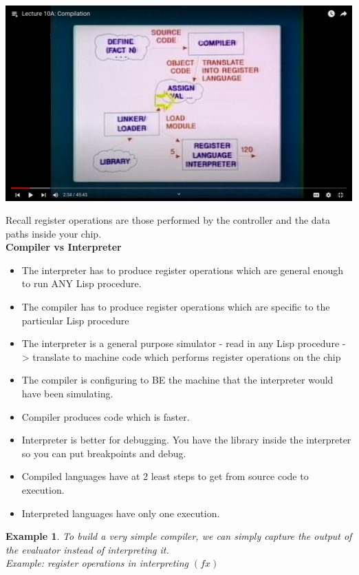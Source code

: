 \documentclass[a4paper,twoside]{article}
\newtheorem{example}[theorem]{Example}
\numberwithin{equation}{section}
\begin{document}
\begin{center}
    \includegraphics[scale = 0.2]{assets/compilers.png}
\end{center}
Recall register operations are those performed by the controller and the data paths inside your chip.\\
\textbf{Compiler vs Interpreter}
\begin{itemize}
    \item The interpreter has to produce register operations which are general
    enough to run ANY Lisp procedure.
    \item The compiler has to produce register operations which are specific to the particular Lisp
    procedure
    \item The interpreter is a general purpose simulator - read in any Lisp procedure -> translate to
    machine code which performs register operations on the chip
    \item The compiler is configuring to BE the machine that the interpreter would have been simulating.
    \item Compiler produces code which is faster.
    \item Interpreter is better for debugging. You have the library inside the interpreter so you can put
    breakpoints and debug.
    \item Compiled languages have at 2 least steps to get from source code to execution.
    \item Interpreted languages have only one execution.
\end{itemize}

\begin{example}
    To build a very simple compiler, we can simply capture the output of the evaluator instead of interpreting it.\\
    Example: register operations in interpreting $(f x)$
\end{example}
\end{document}
